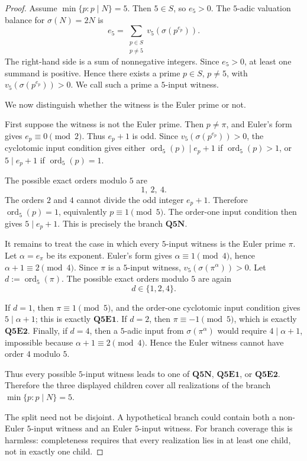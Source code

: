\begin{proof}
Assume \(\min\{p:p\mid N\}=5\).  Then \(5\in S\), so \(e_5>0\).  The
\(5\)-adic valuation balance for \(\sigma(N)=2N\) is
\[
  e_5
  =
  \sum_{\substack{p\in S\\p\ne5}}
  v_5(\sigma(p^{e_p})).
\]
The right-hand side is a sum of nonnegative integers.  Since \(e_5>0\), at least
one summand is positive.  Hence there exists a prime \(p\in S\), \(p\ne5\),
with \(v_5(\sigma(p^{e_p}))>0\).  We call such a prime a \(5\)-input witness.

We now distinguish whether the witness is the Euler prime or not.

First suppose the witness is not the Euler prime.  Then \(p\ne\pi\), and Euler's
form gives \(e_p\equiv0\pmod2\).  Thus \(e_p+1\) is odd.  Since
\(v_5(\sigma(p^{e_p}))>0\),
the cyclotomic input condition gives either
\(\operatorname{ord}_5(p)\mid e_p+1\) if \(\operatorname{ord}_5(p)>1\), or
\(5\mid e_p+1\) if \(\operatorname{ord}_5(p)=1\).

The possible exact orders modulo \(5\) are
\[
  1,\ 2,\ 4.
\]
The orders \(2\) and \(4\) cannot divide the odd integer \(e_p+1\).  Therefore
\(\operatorname{ord}_5(p)=1\), equivalently \(p\equiv1\pmod5\).  The order-one
input condition then gives \(5\mid e_p+1\).  This is precisely the branch
\(\mathbf{Q5N}\).

It remains to treat the case in which every \(5\)-input witness is the Euler
prime \(\pi\).  Let \(\alpha=e_\pi\) be its exponent.  Euler's form gives
\(\alpha\equiv1\pmod4\), hence \(\alpha+1\equiv2\pmod4\).  Since \(\pi\) is a
\(5\)-input witness, \(v_5(\sigma(\pi^\alpha))>0\).  Let
\(d:=\operatorname{ord}_5(\pi)\).
The possible exact orders modulo \(5\) are again
\[
  d\in\{1,2,4\}.
\]

If \(d=1\), then \(\pi\equiv1\pmod5\), and the order-one cyclotomic input
condition gives \(5\mid\alpha+1\); this is exactly \(\mathbf{Q5E1}\).  If
\(d=2\), then \(\pi\equiv-1\pmod5\), which is exactly \(\mathbf{Q5E2}\).  Finally,
if \(d=4\), then a \(5\)-adic input from \(\sigma(\pi^\alpha)\) would require
\(4\mid\alpha+1\), impossible because \(\alpha+1\equiv2\pmod4\).  Hence the
Euler witness cannot have order \(4\) modulo \(5\).

Thus every possible \(5\)-input witness leads to one of \(\mathbf{Q5N}\),
\(\mathbf{Q5E1}\), or \(\mathbf{Q5E2}\).  Therefore the three displayed
children cover all realizations of the branch \(\min\{p:p\mid N\}=5\).

The split need not be disjoint.  A hypothetical branch could contain both a
non-Euler \(5\)-input witness and an Euler \(5\)-input witness.  For branch
coverage this is harmless: completeness requires that every realization lies in
at least one child, not in exactly one child.
\end{proof}

